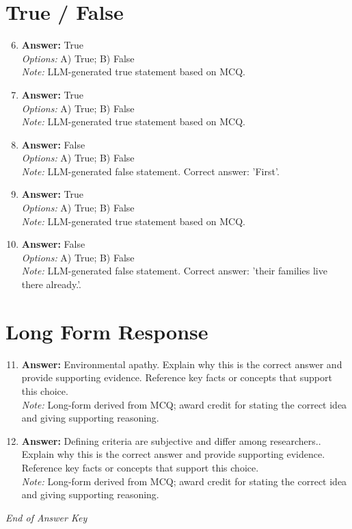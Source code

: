 \documentclass[12pt]{article}
\begin{document}
\section*{True / False}
\begin{enumerate}[label=\arabic*.]
\setcounter{enumi}{5}
\item \textbf{Answer:} True
\\ \textit{Options:} A) True; B) False
\\ \textit{Note:} LLM-generated true statement based on MCQ.
\item \textbf{Answer:} True
\\ \textit{Options:} A) True; B) False
\\ \textit{Note:} LLM-generated true statement based on MCQ.
\item \textbf{Answer:} False
\\ \textit{Options:} A) True; B) False
\\ \textit{Note:} LLM-generated false statement. Correct answer: 'First'.
\item \textbf{Answer:} True
\\ \textit{Options:} A) True; B) False
\\ \textit{Note:} LLM-generated true statement based on MCQ.
\item \textbf{Answer:} False
\\ \textit{Options:} A) True; B) False
\\ \textit{Note:} LLM-generated false statement. Correct answer: 'their families live there already.'.
\end{enumerate}

\section*{Long Form Response}
\begin{enumerate}[label=\arabic*.]
\setcounter{enumi}{10}
\item \textbf{Answer:} Environmental apathy. Explain why this is the correct answer and provide supporting evidence. Reference key facts or concepts that support this choice.
\\ \textit{Note:} Long-form derived from MCQ; award credit for stating the correct idea and giving supporting reasoning.
\item \textbf{Answer:} Defining criteria are subjective and differ among researchers.. Explain why this is the correct answer and provide supporting evidence. Reference key facts or concepts that support this choice.
\\ \textit{Note:} Long-form derived from MCQ; award credit for stating the correct idea and giving supporting reasoning.
\end{enumerate}

\vfill
\noindent\textit{End of Answer Key}
\end{document}
